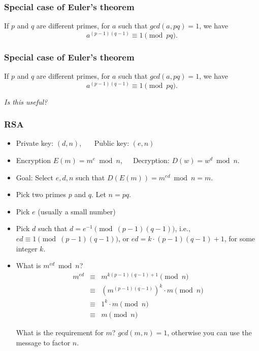 \begin{frame}
  \frametitle{Special case of Euler's theorem}

  \begin{theorem}
    If $p$ and $q$ are different primes, for $a$ such that $gcd(a,pq)=1$, we have
    \[
    a^{(p-1)(q-1)} \equiv 1 \pmod{pq}.
    \]
  \end{theorem}

  \vspace{3in}

\end{frame}

\begin{frame}
  \frametitle{Special case of Euler's theorem}

  \begin{theorem}
    If $p$ and $q$ are different primes, for $a$ such that $gcd(a,pq)=1$, we have
    \[
    a^{(p-1)(q-1)} \equiv 1 \pmod{pq}.
    \]
  \end{theorem}

  \vspace{0.2in}
  {\em Is this useful?} 
\end{frame}

\begin{frame}
  \frametitle{RSA}

  \begin{tcolorbox}
  {\footnotesize
  \begin{itemize}
  \item Private key: $(d,n)$, \ \ \  Public key: $(e,n)$
  \item Encryption $E(m) = m^{e} \bmod n$,\ \ \  Decryption: $D(w) = w^{d} \bmod n$.
  \item Goal: Select $e,d,n$ such that $D(E(m)) = m^{ed}\bmod n = m$.
  \end{itemize}
  }
  \end{tcolorbox}
  
  \vspace{0.1in}
  \pause
  {\footnotesize
  \begin{itemize}
  \item Pick two primes $p$ and $q$.  Let $n=pq$.
  \item Pick $e$ (usually a small number)
  \item Pick $d$ such that $d = e^{-1} \pmod{(p-1)(q-1)}$, i.e., $ed\equiv 1 \pmod{(p-1)(q-1)}$, or $ed = k\cdot(p-1)(q-1) + 1$, for some integer $k$.
  \item What is $m^{ed}\bmod n$? \pause
    \begin{eqnarray*}
      m^{ed} &\equiv& m^{k(p-1)(q-1)+1} \pmod n\\
      &\equiv& (m^{(p-1)(q-1)})^k\cdot m \pmod n\\
      &\equiv& 1^k\cdot m \pmod n\\
      &\equiv& m \pmod n
    \end{eqnarray*}
    \pause

    What is the requirement for $m$?  \pause $gcd(m,n)=1$, otherwise
    you can use the message to factor $n$.
  \end{itemize}
  }
  \vspace{0.5in}
\end{frame}

